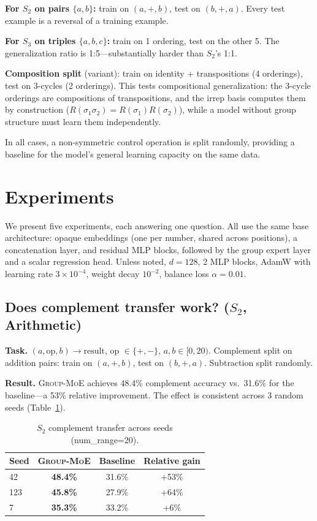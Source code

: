 \documentclass[10pt, letterpaper]{article}
\newcommand{\gmoe}{\textsc{Group-MoE}}
\begin{document}
\textbf{For $S_2$ on pairs $\{a, b\}$:} train on $(a, +, b)$, test on $(b, +, a)$. Every test example is a reversal of a training example.

\textbf{For $S_3$ on triples $\{a, b, c\}$:} train on 1 ordering, test on the other 5. The generalization ratio is 1:5---substantially harder than $S_2$'s 1:1.

\textbf{Composition split} (variant): train on identity + transpositions (4 orderings), test on 3-cycles (2 orderings). This tests compositional generalization: the 3-cycle orderings are compositions of transpositions, and the irrep basis computes them by construction ($R(\sigma_1 \sigma_2) = R(\sigma_1) R(\sigma_2)$), while a model without group structure must learn them independently.

In all cases, a non-symmetric control operation is split randomly, providing a baseline for the model's general learning capacity on the same data.

\section{Experiments}
\label{sec:experiments}

We present five experiments, each answering one question. All use the same base architecture: opaque embeddings (one per number, shared across positions), a concatenation layer, and residual MLP blocks, followed by the group expert layer and a scalar regression head. Unless noted, $d = 128$, 2 MLP blocks, AdamW with learning rate $3 \times 10^{-4}$, weight decay $10^{-2}$, balance loss $\alpha = 0.01$.

\subsection{Does complement transfer work? ($S_2$, Arithmetic)}
\label{sec:exp-s2}

\textbf{Task.} $(a, \text{op}, b) \to \text{result}$, op $\in \{+, -\}$, $a, b \in [0, 20)$. Complement split on addition pairs: train on $(a, +, b)$, test on $(b, +, a)$. Subtraction split randomly.

\textbf{Result.} \gmoe{} achieves 48.4\% complement accuracy vs.\ 31.6\% for the baseline---a 53\% relative improvement. The effect is consistent across 3 random seeds (Table~\ref{tab:s2-seeds}).

\begin{table}[h]
\centering
\caption{$S_2$ complement transfer across seeds (num\_range=20).}
\label{tab:s2-seeds}
\begin{tabular}{lccc}
\toprule
Seed & \gmoe{} & Baseline & Relative gain \\
\midrule
42 & \textbf{48.4\%} & 31.6\% & +53\% \\
123 & \textbf{45.8\%} & 27.9\% & +64\% \\
7 & \textbf{35.3\%} & 33.2\% & +6\% \\
\bottomrule
\end{tabular}
\end{table}
\end{document}
